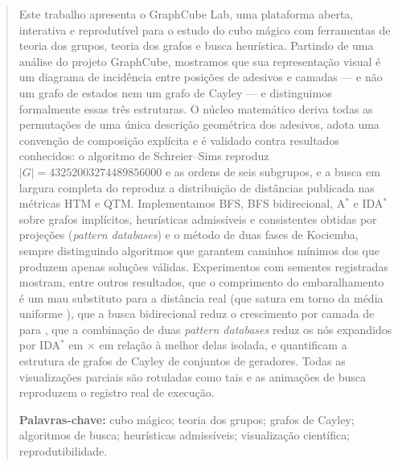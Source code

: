 \begin{abstract}
\noindent
Este trabalho apresenta o GraphCube Lab, uma plataforma aberta, interativa e reprodutível para o estudo do cubo mágico com ferramentas de teoria dos grupos, teoria dos grafos e busca heurística. Partindo de uma análise do projeto GraphCube, mostramos que sua representação visual é um diagrama de incidência entre posições de adesivos e camadas --- e não um grafo de estados nem um grafo de Cayley --- e distinguimos formalmente essas três estruturas. O núcleo matemático deriva todas as permutações de uma única descrição geométrica dos adesivos, adota uma convenção de composição explícita e é validado contra resultados conhecidos: o algoritmo de Schreier--Sims reproduz $|G| = \num{43252003274489856000}$ e as ordens de seis subgrupos, e a busca em largura completa do  reproduz a distribuição de distâncias publicada nas métricas HTM e QTM. Implementamos BFS, BFS bidirecional, A$^*$ e IDA$^*$ sobre grafos implícitos, heurísticas admissíveis e consistentes obtidas por projeções (\textit{pattern databases}) e o método de duas fases de Kociemba, sempre distinguindo algoritmos que garantem caminhos mínimos dos que produzem apenas soluções válidas. Experimentos com sementes registradas mostram, entre outros resultados, que o comprimento do embaralhamento é um mau substituto para a distância real (que satura em torno da média uniforme \gclMeanDistHTM{}), que a busca bidirecional reduz o crescimento por camada de \gclEoneGrowthBFS{} para \gclEoneGrowthBi{}, que a combinação de duas \textit{pattern databases} reduz os nós expandidos por IDA$^*$ em \gclEthreeMaxOverPerm{}$\times$ em relação à melhor delas isolada, e quantificam a estrutura de grafos de Cayley de \gclEfourSets{} conjuntos de geradores. Todas as visualizações parciais são rotuladas como tais e as animações de busca reproduzem o registro real de execução.

\medskip\noindent\textbf{Palavras-chave:} cubo mágico; teoria dos grupos; grafos de Cayley; algoritmos de busca; heurísticas admissíveis; visualização científica; reprodutibilidade.
\end{abstract}

